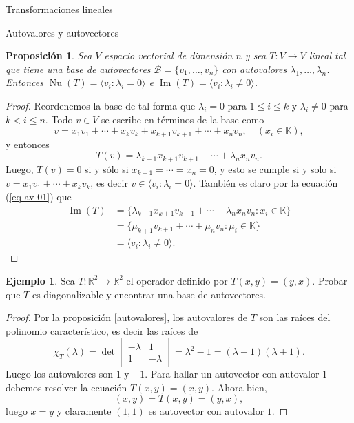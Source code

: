 \documentclass[a4paper,12pt,twoside,spanish,reqno]{amsbook}
\newtheorem{proposicion}[teorema]{Proposici\'on}
\theoremstyle{definition}
\newtheorem{ejemplo}{Ejemplo}[section]
\theoremstyle{remark}
\newcommand{\img}{\operatorname{Im}}
\newcommand{\nuc}{\operatorname{Nu}}
\newcommand{\R}{\mathbb R}
\newcommand{\K}{\mathbb K}
\begin{document}
\begin{chapter}{Transformaciones lineales}
\begin{section}{Autovalores y autovectores}
        \begin{proposicion} Sea $V$ espacio vectorial de dimensión $n$ y sea $T: V \to V$ lineal tal que tiene una base de autovectores $\mathcal{B} = \{v_1,\ldots,v_n \}$  con autovalores $\lambda_1,\ldots,\lambda_n$. Entonces $\nuc(T)=\langle v_i: \lambda_i =0 \rangle$ e  $\img(T)=\langle v_i: \lambda_i \not=0 \rangle$.			
        \end{proposicion}
        \begin{proof} Reordenemos la base de tal forma que  $\lambda_i =0$ para $1 \le i \le k$ y $\lambda_i \ne 0$ para $k < i \le n$. 
        Todo $v \in V$ se escribe en términos de la base como 
        $$
        v = x_1v_1 + \cdots+ x_k v_k+ x_{k+1} v_{k+1}+\cdots+ x_n v_n,\quad (x_i \in \K),
        $$
        y entonces
        \begin{equation}\label{eq-av-01}
            T(v) =  \lambda_{k+1}x_{k+1} v_{k+1}+\cdots+ \lambda_nx_n v_n.
        \end{equation}
        Luego, $T(v) =0$ si y sólo si $x_{k+1} = \cdots = x_n=0$, y esto se cumple si y solo si $v =  x_1v_1 + \cdots+ x_k v_k$,  es decir $v \in \langle v_i: \lambda_i =0 \rangle$. 
        También es claro por la ecuación (\ref{eq-av-01}) que 
        \begin{align*}
            \img(T) &= \{\lambda_{k+1}x_{k+1} v_{k+1}+\cdots+ \lambda_nx_n v_n: x_i \in \K \} \\
            &=\{\mu_{k+1} v_{k+1}+\cdots+ \mu_n v_n: \mu_i \in \K \}\\
            &= \langle v_i: \lambda_i \not=0 \rangle.
        \end{align*}
        \end{proof}
        
        \begin{ejemplo}
            Sea $T:\R^2 \longrightarrow \R^2$ el operador definido por $T(x,y)=(y,x)$. Probar que $T$ es diagonalizable y encontrar una base de autovectores. 
        \end{ejemplo}
        \begin{proof}
            Por la proposición \ref{autovalores}, los autovalores de $T$  son las raíces del polinomio característico,  es decir las raíces de 
            $$
            \chi_T(\lambda)= \det\left[\begin{matrix}
            -\lambda& 1 \\ 1 & -\lambda
            \end{matrix} \right]= \lambda^2 -1  =(\lambda -1)(\lambda +1). 
            $$
            Luego los autovalores son $1$ y $-1$. Para hallar un autovector con autovalor $1$ debemos resolver la ecuación $T(x,y) = (x,y)$. Ahora bien, 
            $$
            (x,y) = T(x,y) = (y,x),
            $$
            luego $x =y$ y claramente $(1,1)$ es autovector con autovalor $1$.
            

\end{proof}
\end{section}
\end{chapter}
\end{document}
